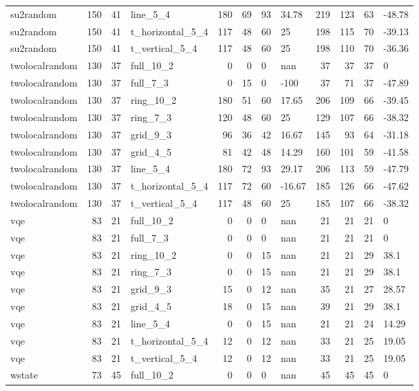 \begin{longtable}{lrrlrrllrrll}
su2random & 150 & 41 & line\_5\_4 & 180 & 69 & 93 & 34.78 & 219 & 123 & 63 & -48.78 \\
su2random & 150 & 41 & t\_horizontal\_5\_4 & 117 & 48 & 60 & 25 & 198 & 115 & 70 & -39.13 \\
su2random & 150 & 41 & t\_vertical\_5\_4 & 117 & 48 & 60 & 25 & 198 & 110 & 70 & -36.36 \\
twolocalrandom & 130 & 37 & full\_10\_2 & 0 & 0 & 0 & nan & 37 & 37 & 37 & 0 \\
twolocalrandom & 130 & 37 & full\_7\_3 & 0 & 15 & 0 & -100 & 37 & 71 & 37 & -47.89 \\
twolocalrandom & 130 & 37 & ring\_10\_2 & 180 & 51 & 60 & 17.65 & 206 & 109 & 66 & -39.45 \\
twolocalrandom & 130 & 37 & ring\_7\_3 & 120 & 48 & 60 & 25 & 129 & 107 & 66 & -38.32 \\
twolocalrandom & 130 & 37 & grid\_9\_3 & 96 & 36 & 42 & 16.67 & 145 & 93 & 64 & -31.18 \\
twolocalrandom & 130 & 37 & grid\_4\_5 & 81 & 42 & 48 & 14.29 & 160 & 101 & 59 & -41.58 \\
twolocalrandom & 130 & 37 & line\_5\_4 & 180 & 72 & 93 & 29.17 & 206 & 113 & 59 & -47.79 \\
twolocalrandom & 130 & 37 & t\_horizontal\_5\_4 & 117 & 72 & 60 & -16.67 & 185 & 126 & 66 & -47.62 \\
twolocalrandom & 130 & 37 & t\_vertical\_5\_4 & 117 & 48 & 60 & 25 & 185 & 107 & 66 & -38.32 \\
vqe & 83 & 21 & full\_10\_2 & 0 & 0 & 0 & nan & 21 & 21 & 21 & 0 \\
vqe & 83 & 21 & full\_7\_3 & 0 & 0 & 0 & nan & 21 & 21 & 21 & 0 \\
vqe & 83 & 21 & ring\_10\_2 & 0 & 0 & 15 & nan & 21 & 21 & 29 & 38.1 \\
vqe & 83 & 21 & ring\_7\_3 & 0 & 0 & 15 & nan & 21 & 21 & 29 & 38.1 \\
vqe & 83 & 21 & grid\_9\_3 & 15 & 0 & 12 & nan & 35 & 21 & 27 & 28.57 \\
vqe & 83 & 21 & grid\_4\_5 & 18 & 0 & 15 & nan & 39 & 21 & 29 & 38.1 \\
vqe & 83 & 21 & line\_5\_4 & 0 & 0 & 15 & nan & 21 & 21 & 24 & 14.29 \\
vqe & 83 & 21 & t\_horizontal\_5\_4 & 12 & 0 & 12 & nan & 33 & 21 & 25 & 19.05 \\
vqe & 83 & 21 & t\_vertical\_5\_4 & 12 & 0 & 12 & nan & 33 & 21 & 25 & 19.05 \\
wstate & 73 & 45 & full\_10\_2 & 0 & 0 & 0 & nan & 45 & 45 & 45 & 0 \\

\end{longtable}

